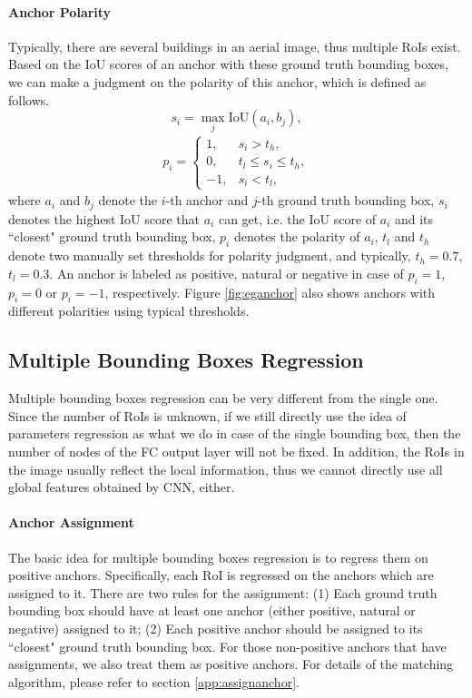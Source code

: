 

\paragraph{Anchor Polarity}
Typically, there are several buildings in an aerial image, thus multiple RoIs exist. Based on the IoU scores of an anchor with these ground truth bounding boxes, we can make a judgment on the polarity of this anchor, which is defined as follows.
\begin{equation}
	s_i = \max_{j} \text{IoU}(a_i, b_j),
\end{equation}
\begin{equation}
\begin{aligned}
	p_i = \begin{cases}
		1, & s_i > t_h, \\
		0, & t_l \leqslant s_i \leqslant t_h,\\
		-1, & s_i < t_l,
	\end{cases}
\end{aligned}
\end{equation}
where $a_i$ and $b_j$ denote the $i$-th anchor and $j$-th ground truth bounding box, $s_i$ denotes the highest IoU score that $a_i$ can get, i.e. the IoU score of $a_i$ and its ``closest" ground truth bounding box, $p_i$ denotes the polarity of $a_i$, $t_l$ and $t_h$ denote two manually set thresholds for polarity judgment, and typically, $t_h = 0.7$, $t_l = 0.3$. An anchor is labeled as positive, natural or negative in case of $p_i = 1$, $p_i = 0$ or $p_i = -1$, respectively. Figure \ref{fig:eganchor} also shows anchors with different polarities using typical thresholds.

\subsection{Multiple Bounding Boxes Regression}\label{mulbboxreg}
Multiple bounding boxes regression can be very different from the single one. Since the number of RoIs is unknown, if we still directly use the idea of parameters regression as what we do in case of the single bounding box, then the number of nodes of the FC output layer will not be fixed. In addition, the RoIs in the image usually reflect the local information, thus we cannot directly use all global features obtained by CNN, either.

\paragraph{Anchor Assignment}
The basic idea for multiple bounding boxes regression is to regress them on positive anchors. Specifically, each RoI is regressed on the anchors which are assigned to it. There are two rules for the assignment: (1) Each ground truth bounding box should have at least one anchor (either positive, natural or negative) assigned to it; (2) Each positive anchor should be assigned to its ``closest" ground truth bounding box. For those non-positive anchors that have assignments, we also treat them as positive anchors. For details of the matching algorithm, please refer to section \ref{app:assignanchor}.

